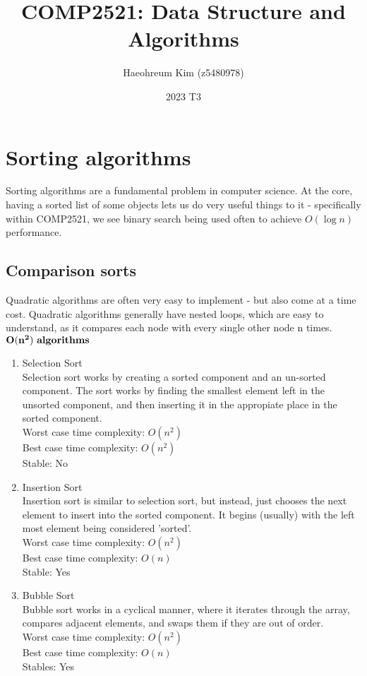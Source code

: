 \documentclass[14]{article}
\title{COMP2521: Data Structure and Algorithms}
\author{Haeohreum Kim (z5480978)}
\date{2023 T3}
\begin{document}
\begin{titlingpage}
\maketitle
\end{titlingpage}
\newpage
\section{Sorting algorithms}
Sorting algorithms are a fundamental problem in computer science. At the core, having a sorted list of some objects lets us
do very useful things to it - specifically within COMP2521, we see binary search being used often to achieve $O(\log n)$ performance.
\subsection{Comparison sorts}
Quadratic algorithms are often very easy to implement - but also come at a time cost. Quadratic algorithms generally have 
nested loops, which are easy to understand, as it compares each node with every single other node n times. \\ 
$\mathbf{O(n^2) \text{ \textbf{algorithms}}}$
\begin{enumerate}
	\item Selection Sort \\ 
	Selection sort works by creating a sorted component and an un-sorted component. The sort works by finding the smallest
	element left in the unsorted component, and then inserting it in the appropiate place in the sorted component. \\ 
	Worst case time complexity: $O(n^2)$ \\ 
	Best case time complexity: $O(n^2)$ \\ 
	Stable: No \\ 
	\item Insertion Sort \\ 
	Insertion sort is similar to selection sort, but instead, just chooses the next element to insert into the 
	sorted component. It begins (usually) with the left most element being considered 'sorted'. \\ 
	Worst case time complexity: $O(n^2)$ \\ 
	Best case time complexity: $O(n)$ \\
	Stable: Yes \\ 
	\item Bubble Sort \\
	Bubble sort works in a cyclical manner, where it iterates through the array, compares adjacent elements,
	and swaps them if they are out of order. \\ 
	Worst case time complexity: $O(n^2)$ \\ 
	Best case time complexity: $O(n)$ \\
	Stables: Yes \\ 
\end{enumerate}
\end{document}
